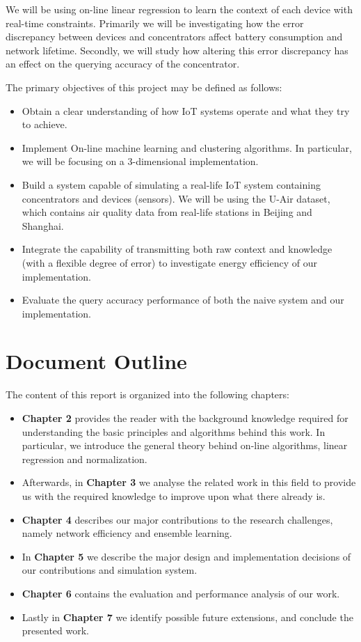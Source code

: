 \documentclass{mproj}
\begin{document}
We will be using on-line linear regression to learn the context of each device with real-time constraints. Primarily we will be investigating how the error discrepancy between devices and concentrators affect battery consumption and network lifetime. Secondly, we will study how altering this error discrepancy has an effect on the querying accuracy of the concentrator.

The primary objectives of this project may be defined as follows:
\begin{itemize}  
\item Obtain a clear understanding of how IoT systems operate and what they try to achieve.
\item Implement On-line machine learning and clustering algorithms. In particular, we will be focusing on a 3-dimensional implementation.
\item Build a system capable of simulating a real-life IoT system containing concentrators and devices (sensors). We will be using the U-Air \cite{air-quality-inference-meets-big-data} dataset, which contains air quality data from real-life stations in Beijing and Shanghai.
\item Integrate the capability of transmitting both raw context and knowledge (with a flexible degree of error) to investigate energy efficiency of our implementation.
\item Evaluate the query accuracy performance of both the naive system and our implementation.
\end{itemize}

\section{Document Outline}
The content of this report is organized into the following chapters:
\begin{itemize}
\item \textbf{Chapter 2} provides the reader with the background knowledge required for understanding the basic principles and algorithms behind this work. In particular, we introduce the general theory behind on-line algorithms, linear regression and normalization.
\item Afterwards, in \textbf{Chapter 3} we analyse the related work in this field to provide us with the required knowledge to improve upon what there already is.
\item \textbf{Chapter 4} describes our major contributions to the research challenges, namely network efficiency and ensemble learning.
\item In \textbf{Chapter 5} we describe the major design and implementation decisions of our contributions and simulation system.
\item \textbf{Chapter 6} contains the evaluation and performance analysis of our work.
\item Lastly in \textbf{Chapter 7} we identify possible future extensions, and conclude the presented work.
\end{itemize}
\end{document}
